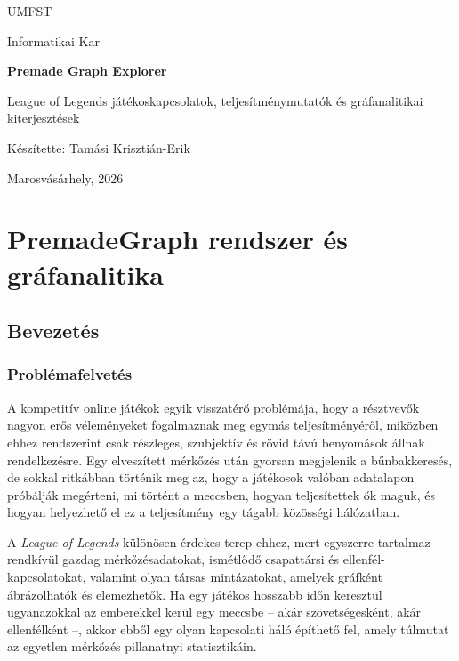 ﻿\documentclass[a4paper,12pt]{report}
\begin{document}
\begin{titlepage}
    \centering
    {\LARGE UMFST \par}
    \vspace{1.2cm}
    {\Large Informatikai Kar \par}
    \vspace{3.3cm}
    {\huge\bfseries Premade Graph Explorer\par}
    \vspace{0.5cm}
    {\Large League of Legends játékoskapcsolatok, teljesítménymutatók és gráfanalitikai kiterjesztések\par}
    \vfill
    {\Large Készítette: Tamási Krisztián-Erik\par}
    \vspace{2.3cm}
    {\large Marosvásárhely, 2026\par}
\end{titlepage}

\tableofcontents
\clearpage

\part{PremadeGraph rendszer és gráfanalitika}

\chapter{Bevezetés}

\section{Problémafelvetés}

A kompetitív online játékok egyik visszatérő problémája, hogy a résztvevők nagyon erős véleményeket fogalmaznak meg egymás teljesítményéről, miközben ehhez rendszerint csak részleges, szubjektív és rövid távú benyomások állnak rendelkezésre. Egy elveszített mérkőzés után gyorsan megjelenik a bűnbakkeresés, de sokkal ritkábban történik meg az, hogy a játékosok valóban adatalapon próbálják megérteni, mi történt a meccsben, hogyan teljesítettek ők maguk, és hogyan helyezhető el ez a teljesítmény egy tágabb közösségi hálózatban.

A \emph{League of Legends} különösen érdekes terep ehhez, mert egyszerre tartalmaz rendkívül gazdag mérkőzésadatokat, ismétlődő csapattársi és ellenfél-kapcsolatokat, valamint olyan társas mintázatokat, amelyek gráfként ábrázolhatók és elemezhetők. Ha egy játékos hosszabb időn keresztül ugyanazokkal az emberekkel kerül egy meccsbe -- akár szövetségesként, akár ellenfélként --, akkor ebből egy olyan kapcsolati háló építhető fel, amely túlmutat az egyetlen mérkőzés pillanatnyi statisztikáin.
\end{document}
